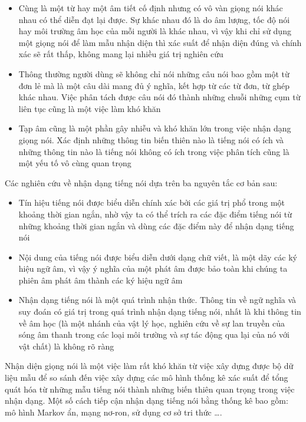 \documentclass[12pt]{report}
\begin{document}
\begin{itemize}
	\item Cùng là một từ hay một âm tiết cố định nhưng có vô vàn giọng nói khác nhau có thể diễn đạt lại được. Sự khác nhau đó là do âm lượng, tốc độ nói hay môi trường âm học của mỗi người là khác nhau, vì vậy khi chỉ sử dụng một giọng nói để làm mẫu nhận diện thì xác suất để nhận diện đúng và chính xác sẽ rất thấp, không mang lại nhiều giá trị nghiên cứu
	\item Thông thường người dùng sẽ không chỉ nói những câu nói bao gồm một từ đơn lẻ mà là một câu dài mang đủ ý nghĩa, kết hợp từ các từ đơn, từ ghép khác nhau. Việc phân tách được câu nói đó thành những chuỗi những cụm từ liên tục cũng là một việc làm khó khăn
	\item Tạp âm cũng là một phần gây nhiễu và khó khăn lớn trong việc nhận dạng giọng nói. Xác định những thông tin biến thiên nào là tiếng nói có ích và những thông tin nào là tiếng nói không có ích trong việc phân tích cũng là một yếu tố vô cùng quan trọng
\end{itemize}

\noindent Các nghiên cứu về nhận dạng tiếng nói dựa trên ba nguyên tắc cơ bản sau:
\begin{itemize}
	\item Tín hiệu tiếng nói được biểu diễn chính xác bởi các giá trị phổ trong một khoảng thời gian ngắn, nhờ vậy ta có thể trích ra các đặc điểm tiếng nói từ những khoảng thời gian ngắn và dùng các đặc điểm này để nhận dạng tiếng nói
	\item Nội dung của tiếng nói được biểu diễn dưới dạng chữ viết, là một dãy các ký hiệu ngữ âm, vì vậy ý nghĩa của một phát âm được bảo toàn khi chúng ta phiên âm phát âm thành các ký hiệu ngữ âm
	\item Nhận dạng tiếng nói là một quá trình nhận thức. Thông tin về ngữ nghĩa và suy đoán có giá trị trong quá trình nhận dạng tiếng nói, nhất là khi thông tin về âm học (là một nhánh của vật lý học, nghiên cứu về sự lan truyền của sóng âm thanh trong các loại môi trường và sự tác động qua lại của nó với vật chất) là không rõ ràng
\end{itemize}

Nhận diện giọng nói là một việc làm rất khó khăn từ việc xây dựng được bộ dữ liệu mẫu để so sánh đến việc xây dựng các mô hình thống kê xác suất để tổng quát hóa từ những mẫu tiếng nói thành những biến thiên quan trọng trong việc nhận dạng. Một số cách tiếp cận nhận dạng tiếng nói bằng thống kê bao gồm: mô hình Markov ẩn, mạng nơ-ron, sử dụng cơ sở tri thức \ldots.
\end{document}
